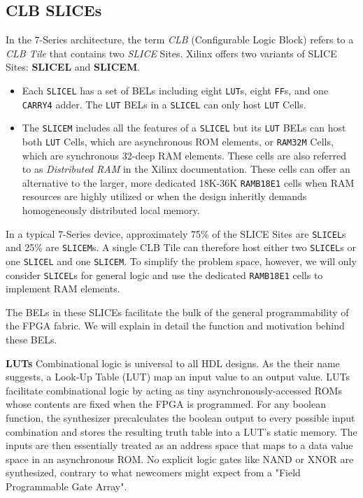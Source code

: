 \begin{multicols}{2}

\newpage
\subsection{CLB SLICEs}

In the 7-Series architecture, the term \emph{CLB} (Configurable Logic Block) refers to a \emph{CLB Tile} that contains two \emph{SLICE} Sites. 
Xilinx offers two variants of SLICE Sites: \textbf{SLICEL} and \textbf{SLICEM}.
\begin{itemize}
\item Each \texttt{SLICEL} has a set of BELs including eight \texttt{LUT}s, eight \texttt{FF}s, and one \texttt{CARRY4} adder. The \texttt{LUT} BELs in a \texttt{SLICEL} can only host \texttt{LUT} Cells. 
\item The \texttt{SLICEM} includes all the features of a \texttt{SLICEL} but its \texttt{LUT} BELs can host both \texttt{LUT} Cells, which are asynchronous ROM elements, or \texttt{RAM32M} Cells, which are synchronous 32-deep RAM elements. These cells are also referred to as \emph{Distributed RAM} in the Xilinx documentation.
    These cells can offer an alternative to the larger, more dedicated 18K-36K \texttt{RAMB18E1} cells when RAM resources are highly utilized or when the design inheritly demands homogeneously distributed local memory. 
\end{itemize}
In a typical 7-Series device, approximately 75\% of the SLICE Sites are \texttt{SLICEL}s and 25\% are \texttt{SLICEM}s. 
A single CLB Tile can therefore host either two \texttt{SLICEL}s or one \texttt{SLICEL} and one \texttt{SLICEM}.
To simplify the problem space, however, we will only consider \texttt{SLICEL}s for general logic and use the dedicated \texttt{RAMB18E1} cells to implement RAM elements. 

The BELs in these SLICEs facilitate the bulk of the general programmability of the FPGA fabric. 
We will explain in detail the function and motivation behind these BELs. 


\textbf{LUTs} \quad
Combinational logic is universal to all HDL designs. 
As the their name suggests, a Look‑Up Table (LUT) map an input value to an output value. 
LUTs facilitate combinational logic by acting as tiny asynchronously‑accessed ROMs whose contents are fixed when the FPGA is programmed.  
For any boolean function, the synthesizer precalculates the boolean output to every possible input combination and stores the resulting truth table into a LUT's static memory. 
The inputs are then essentially treated as an address space that maps to a data value space in an asynchronous ROM. 
No explicit logic gates like NAND or XNOR are synthesized, contrary to what newcomers might expect from a "Field Programmable Gate Array". 


\end{multicols}
